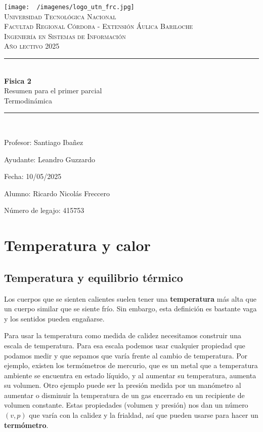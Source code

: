 \documentclass[12pt]{article}
\begin{document}
  \begin{titlepage}
    \centering
    \texttt{[image: ~/imagenes/logo\_utn\_frc.jpg]}\\

    \textsc{
      \LARGE Universidad Tecnológica Nacional\\
      \Large Facultad Regional Córdoba - Extensión Áulica Bariloche\\
      \large Ingeniería en Sistemas de Información\\
      Año lectivo 2025\\[0.5cm]
    }

    \rule{\linewidth}{1.0mm}\\[0.4cm]
    \Huge
    \textbf{Fisica 2}\\
    Resumen para el primer parcial\\[0.2cm]
    \LARGE
    Termodinámica
    \rule{\linewidth}{1.0mm}\\
    \large
    \begin{flushleft}
      Profesor: Santiago Ibañez

      Ayudante: Leandro Guzzardo

      Fecha: 10/05/2025
    \end{flushleft}

    \vfill
    \begin{flushright}
      Alumno: Ricardo Nicolás Freccero  

      Número de legajo: 415753
    \end{flushright}
  \end{titlepage}
  
  \restoregeometry
  \tableofcontents
  \newpage

  \section{Temperatura y calor}
  \subsection{Temperatura y equilibrio térmico}
  Los cuerpos que se sienten calientes suelen tener una \textbf{temperatura} más alta que un cuerpo similar que se siente frío. Sin embargo, esta definición es bastante vaga y los sentidos pueden engañarse.

  Para usar la temperatura como medida de calidez necesitamos construir una escala de temperatura. Para esa escala podemos usar cualquier propiedad que podamos medir y que sepamos que varía frente al cambio de temperatura. Por ejemplo, existen los termómetros de mercurio, que es un metal que a temperatura ambiente se encuentra en estado líquido, y al aumentar su temperatura, aumenta su volumen. Otro ejemplo puede ser la presión medida por un manómetro al aumentar o disminuir la temperatura de un gas encerrado en un recipiente de volumen constante. Estas propiedades (volumen y presión) nos dan un número $ (v,p) $ que varía con la calidez y la frialdad, así que pueden usarse para hacer un \textbf{termómetro}.
\end{document}
